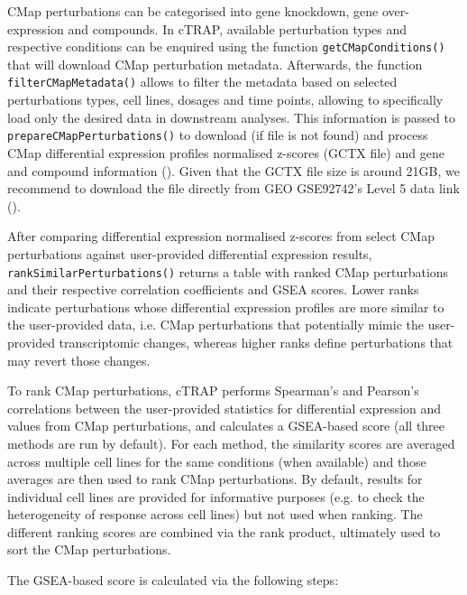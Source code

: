 CMap perturbations can be categorised into gene knockdown, gene over-expression and compounds. In cTRAP, available perturbation types and respective conditions can be enquired using the function \texttt{getCMapConditions()} that will download CMap perturbation metadata. Afterwards, the function \texttt{filterCMapMetadata()} allows to filter the metadata based on selected perturbations types, cell lines, dosages and time points, allowing to specifically load only the desired data in downstream analyses. This information is passed to \texttt{prepareCMapPerturbations()} to download (if file is not found) and process CMap differential expression profiles normalised z-scores (GCTX file) and gene and compound information (). Given that the GCTX file size is around 21GB, we recommend to download the file directly from GEO GSE92742’s Level 5 data link ().

After comparing differential expression normalised z-scores from select CMap perturbations against user-provided differential expression results, \texttt{rankSimilarPerturbations()} returns a table with ranked CMap perturbations and their respective correlation coefficients and GSEA scores. Lower ranks indicate perturbations whose differential expression profiles are more similar to the user-provided data, i.e. CMap perturbations that potentially mimic the user-provided transcriptomic changes, whereas higher ranks define perturbations that may revert those changes.

To rank CMap perturbations, cTRAP performs Spearman's and Pearson's correlations between the user-provided statistics for differential expression and values from CMap perturbations, and calculates a GSEA-based score (all three methods are run by default). For each method, the similarity scores are averaged across multiple cell lines for the same conditions (when available) and those averages are then used to rank CMap perturbations. By default, results for individual cell lines are provided for informative purposes (e.g. to check the heterogeneity of response across cell lines) but not used when ranking. The different ranking scores are combined via the rank product, ultimately used to sort the CMap perturbations. %

The GSEA-based score is calculated via the following steps:

